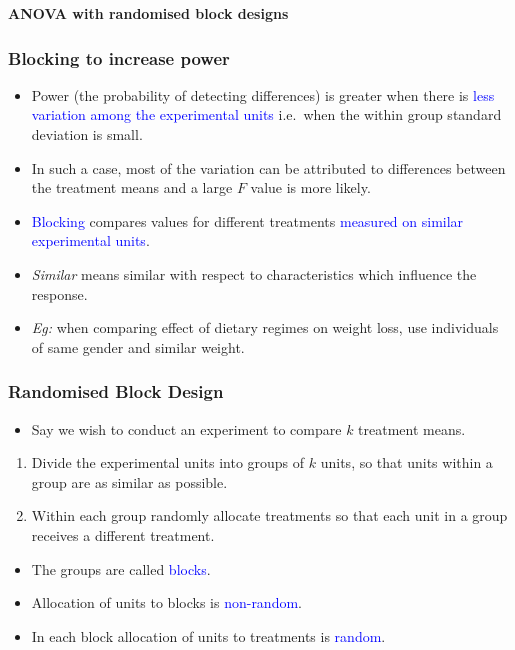 \documentclass[12pt,xcolor=dvipsnames,handout,mathserif,aspectratio=169]{beamer}
\newcommand{\bbl}[1]{{\color{NavyBlue} \textbf{#1}}}
\newcommand{\tc}{\textcolor}
\begin{document}
\begin{frame}
\huge{\bbl{ANOVA with randomised block designs}}
\end{frame}

\begin{frame}
\frametitle{Blocking to increase power}
\begin{itemize}
\item Power (the probability of detecting differences) is greater when there is \tc{blue}{less variation
among the experimental units}
i.e.~when the within group standard deviation is small.
\vspace*{0.1cm}
\item In such a case, most of the variation can be attributed to differences between the treatment
means and a large $F$ value is more likely.
\vspace*{0.1cm}
\item \tc{blue}{Blocking} compares values for different treatments \tc{blue}{measured on similar experimental units}.
\vspace{0.1cm}
\item \textit{Similar} means similar with respect to characteristics which influence the response.
\vspace*{0.1cm}
\item \emph{Eg:} when comparing effect of dietary regimes on weight loss, use individuals of same gender
and similar weight.
\end{itemize}
\end{frame}


\begin{frame}\frametitle{Randomised Block Design}
\begin{itemize}
\item Say we wish to conduct an experiment to compare $k$ treatment means.
\end{itemize}
\vspace*{0.3cm}
\begin{enumerate}
\item Divide the experimental units into groups of $k$ units, so that units within a group are as similar as possible.
\item Within each group randomly allocate treatments so that each unit in a group receives a
different treatment.
\end{enumerate}
\vspace*{0.3cm}
\begin{itemize}
\item The groups are called \tc{blue}{blocks}.
\vspace*{0.2cm}
\item Allocation of units to blocks is \tc{blue}{non-random}.
\vspace*{0.2cm}
\item In each block allocation of units to treatments is \tc{blue}{random}.
\end{itemize}
\end{frame}
\end{document}
